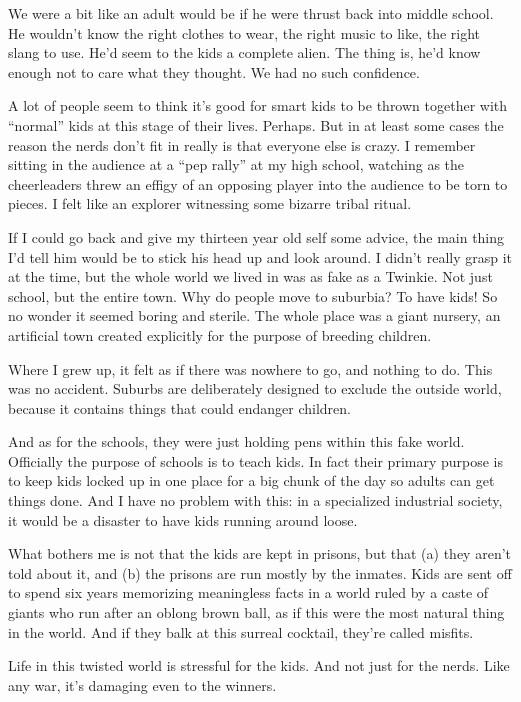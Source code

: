 We were a bit like an adult would be if he were thrust back into middle
school. He wouldn't know the right clothes to wear, the right music to
like, the right slang to use. He'd seem to the kids a complete alien.
The thing is, he'd know enough not to care what they thought. We had no
such confidence.

A lot of people seem to think it's good for smart kids to be thrown
together with ``normal'' kids at this stage of their lives. Perhaps. But
in at least some cases the reason the nerds don't fit in really is that
everyone else is crazy. I remember sitting in the audience at a ``pep
rally'' at my high school, watching as the cheerleaders threw an effigy
of an opposing player into the audience to be torn to pieces. I felt
like an explorer witnessing some bizarre tribal ritual.

If I could go back and give my thirteen year old self some advice, the
main thing I'd tell him would be to stick his head up and look around. I
didn't really grasp it at the time, but the whole world we lived in was
as fake as a Twinkie. Not just school, but the entire town. Why do
people move to suburbia? To have kids! So no wonder it seemed boring and
sterile. The whole place was a giant nursery, an artificial town created
explicitly for the purpose of breeding children.

Where I grew up, it felt as if there was nowhere to go, and nothing to
do. This was no accident. Suburbs are deliberately designed to exclude
the outside world, because it contains things that could endanger
children.

And as for the schools, they were just holding pens within this fake
world. Officially the purpose of schools is to teach kids. In fact their
primary purpose is to keep kids locked up in one place for a big chunk
of the day so adults can get things done. And I have no problem with
this: in a specialized industrial society, it would be a disaster to
have kids running around loose.

What bothers me is not that the kids are kept in prisons, but that (a)
they aren't told about it, and (b) the prisons are run mostly by the
inmates. Kids are sent off to spend six years memorizing meaningless
facts in a world ruled by a caste of giants who run after an oblong
brown ball, as if this were the most natural thing in the world. And if
they balk at this surreal cocktail, they're called misfits.

Life in this twisted world is stressful for the kids. And not just for
the nerds. Like any war, it's damaging even to the winners.

